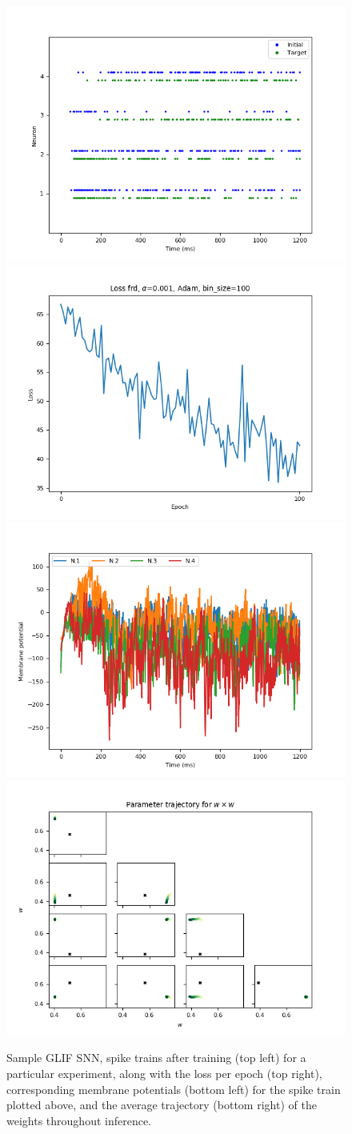\documentclass[mphil,deptreport,ianc]{infthesis} %
\begin{document}
\begin{figure}
    \centering
    \includegraphics[width=0.5\columnwidth]{figures/samples/GLIF/12-09_16-14-54-627/spike_trains_train_iter_100.png}
    \includegraphics[width=0.49\columnwidth]{figures/samples/GLIF/12-09_16-14-54-627/plot_loss_test12-09_16-16-45-54312-09_16-16-45-543.png}
    \hspace{-0.15in}
    \includegraphics[width=0.5\columnwidth]{figures/samples/GLIF/12-09_16-14-54-627/membrane_pots_train_i_100.png}
    \includegraphics[width=0.49\columnwidth]{figures/samples/GLIF/12-09_16-14-54-627/test_weights_inference_trajectories_param_w.png}
    
    \caption{Sample GLIF SNN, spike trains after training (top left) for a particular experiment, along with the loss per epoch (top right), corresponding membrane potentials (bottom left) for the spike train plotted above, and the average trajectory (bottom right) of the weights throughout inference.}
    \label{fig:sample_GLIF_exp}
\end{figure}
\end{document}
